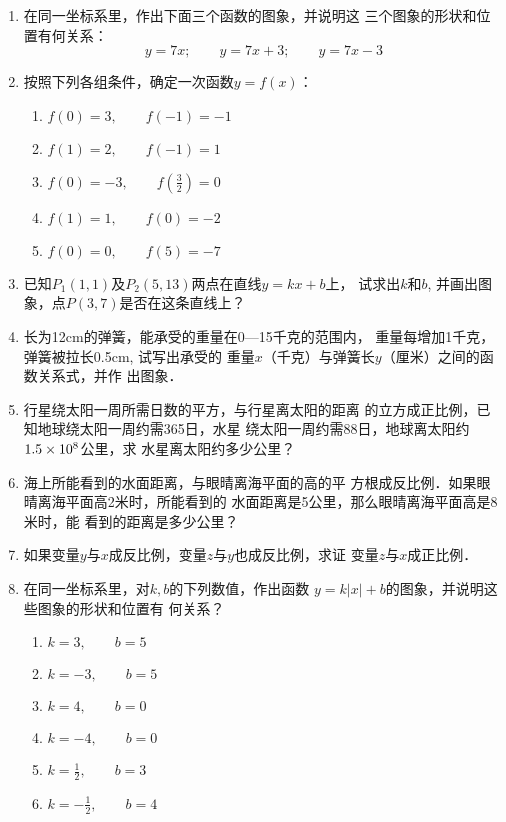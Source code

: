 \begin{enumerate}
\item 在同一坐标系里，作出下面三个函数的图象，并说明这
三个图象的形状和位置有何关系：
\[y=7x;\qquad y=7x+3;\qquad y=7x-3\]
\item 
按照下列各组条件，确定一次函数$y=f(x)$：
\begin{multicols}{2}
\begin{enumerate}
    \item $f(0)=3,\qquad f(-1)=-1$
    \item $f(1)=2,\qquad f(-1)=1$
    \item $f(0)=-3,\qquad f\left(\frac{3}{2}\right)=0$
    \item $f(1)=1,\qquad f(0)=-2$
    \item $f(0)=0,\qquad f(5)=-7$
\end{enumerate}
\end{multicols}
\item 已知$P_1(1,1)$及$P_2(5,13)$两点在直线$y=kx+b$上，
试求出$k$和$b$, 并画出图象，点$P(3,7)$是否在这条直线上？
\item 长为12cm的弹簧，能承受的重量在0—15千克的范围内，
重量每增加1千克，弹簧被拉长0.5cm, 试写出承受的
重量$x$（千克）与弹簧长$y$（厘米）之间的函数关系式，并作
出图象．
\item 
行星绕太阳一周所需日数的平方，与行星离太阳的距离
的立方成正比例，已知地球绕太阳一周约需365日，水星
绕太阳一周约需88日，地球离太阳约$1.5\times10^8$公里，求
水星离太阳约多少公里？
\item 海上所能看到的水面距离，与眼晴离海平面的高的平
方根成反比例．如果眼晴离海平面高2米时，所能看到的
水面距离是5公里，那么眼晴离海平面高是8米时，能
看到的距离是多少公里？
\item 如果变量$y$与$x$成反比例，变量$z$与$y$也成反比例，求证
变量$z$与$x$成正比例．
\item 在同一坐标系里，对$k,b$的下列数值，作出函数
$y=k|x|+b$的图象，并说明这些图象的形状和位置有
何关系？
\begin{multicols}{2}
\begin{enumerate}
    \item $k=3,\qquad b=5$
    \item $k=-3,\qquad b=5$
    \item $k=4,\qquad b=0$
    \item $k=-4,\qquad b=0$
    \item $k=\frac{1}{2},\qquad b=3$
    \item $k=-\frac{1}{2},\qquad b=4$
\end{enumerate}
\end{multicols}

\end{enumerate}

